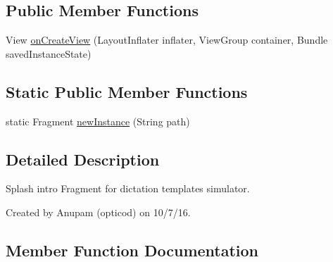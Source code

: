 \subsection*{Public Member Functions}
\begin{DoxyCompactItemize}
\item 
View \hyperlink{classorg_1_1buildmlearn_1_1toolkit_1_1dictationtemplate_1_1fragment_1_1SplashFragment_a687e5209f70affabea624f0801e6e110}{on\+Create\+View} (Layout\+Inflater inflater, View\+Group container, Bundle saved\+Instance\+State)
\end{DoxyCompactItemize}
\subsection*{Static Public Member Functions}
\begin{DoxyCompactItemize}
\item 
static Fragment \hyperlink{classorg_1_1buildmlearn_1_1toolkit_1_1dictationtemplate_1_1fragment_1_1SplashFragment_aff8544c36818a4384326b64f35c58350}{new\+Instance} (String path)
\end{DoxyCompactItemize}


\subsection{Detailed Description}
Splash intro Fragment for dictation template\textquotesingle{}s simulator. 

Created by Anupam (opticod) on 10/7/16. 

\subsection{Member Function Documentation}
